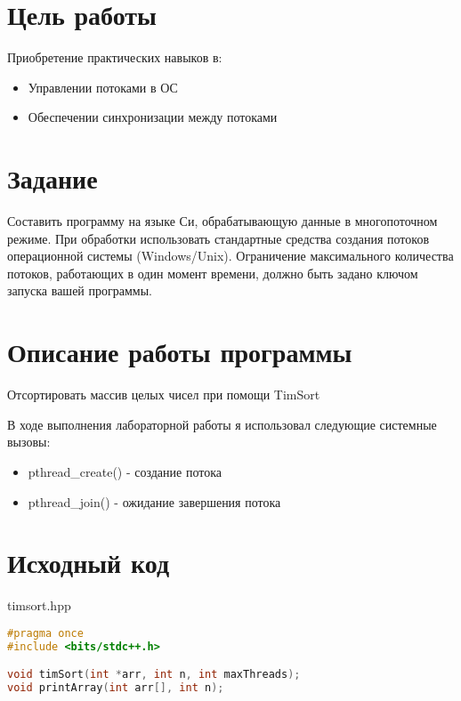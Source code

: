 \documentclass[a4paper, 12pt]{article}
\begin{document}
\section{Цель работы}
Приобретение практических навыков в:
\begin{itemize}
    \item Управлении потоками в ОС
    \item Обеспечении синхронизации между потоками
\end{itemize}

\section{Задание}
Составить программу на языке Си, обрабатывающую данные в многопоточном режиме. При обработки использовать стандартные средства создания потоков операционной системы (Windows/Unix). Ограничение максимального количества потоков, работающих в один момент времени, должно быть задано ключом запуска вашей программы.

\section{Описание работы программы}
Отсортировать массив целых чисел при помощи TimSort

В ходе выполнения лабораторной работы я использовал следующие системные вызовы:
\begin{itemize}
    \item pthread\_create() - создание потока
    \item pthread\_join() - ожидание завершения потока
\end{itemize}


\newpage

\section{Исходный код}
timsort.hpp
\begin{lstlisting}[language=C++]
#pragma once
#include <bits/stdc++.h>

void timSort(int *arr, int n, int maxThreads);
void printArray(int arr[], int n);
\end{lstlisting}
\end{document}
